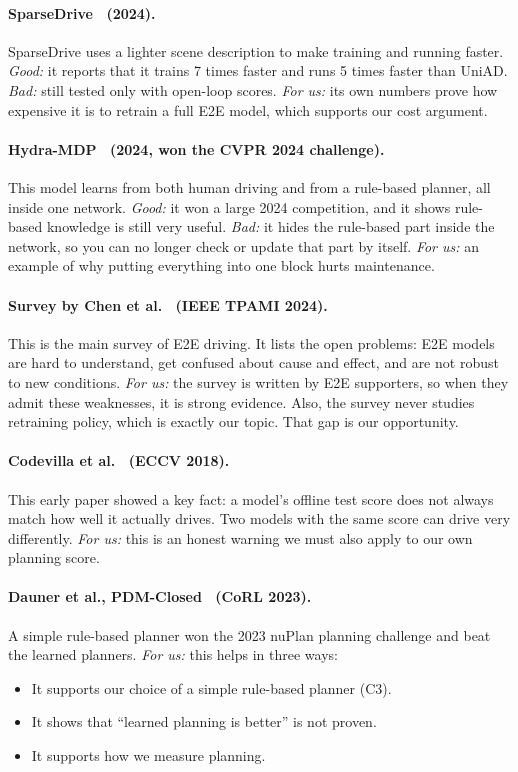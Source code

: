 \documentclass[11pt,a4paper]{article}
\begin{document}
\paragraph{SparseDrive~\cite{sun2024sparsedrive} (2024).}
SparseDrive uses a lighter scene description to make training and running
faster. \emph{Good:} it reports that it trains 7 times faster and runs
5 times faster than UniAD. \emph{Bad:} still tested only with open-loop
scores. \emph{For us:} its own numbers prove how expensive it is to
retrain a full E2E model, which supports our cost argument.

\paragraph{Hydra-MDP~\cite{li2024hydramdp} (2024, won the CVPR 2024 challenge).}
This model learns from both human driving and from a rule-based planner,
all inside one network. \emph{Good:} it won a large 2024 competition, and
it shows rule-based knowledge is still very useful. \emph{Bad:} it hides
the rule-based part inside the network, so you can no longer check or
update that part by itself. \emph{For us:} an example of why putting
everything into one block hurts maintenance.

\paragraph{Survey by Chen et al.~\cite{chen2024e2esurvey} (IEEE TPAMI 2024).}
This is the main survey of E2E driving. It lists the open problems:
E2E models are hard to understand, get confused about cause and effect,
and are not robust to new conditions. \emph{For us:} the survey is
written by E2E supporters, so when they admit these weaknesses, it is
strong evidence. Also, the survey never studies retraining policy, which
is exactly our topic. That gap is our opportunity.

\paragraph{Codevilla et al.~\cite{codevilla2018offline} (ECCV 2018).}
This early paper showed a key fact: a model's offline test score does not
always match how well it actually drives. Two models with the same score
can drive very differently. \emph{For us:} this is an honest warning we
must also apply to our own planning score.

\paragraph{Dauner et al., PDM-Closed~\cite{dauner2023parting} (CoRL 2023).}
A simple rule-based planner won the 2023 nuPlan planning challenge and
beat the learned planners. \emph{For us:} this helps in three ways:
\begin{itemize}[noitemsep]
    \item It supports our choice of a simple rule-based planner (C3).
    \item It shows that ``learned planning is better'' is not proven.
    \item It supports how we measure planning.
\end{itemize}
\end{document}
